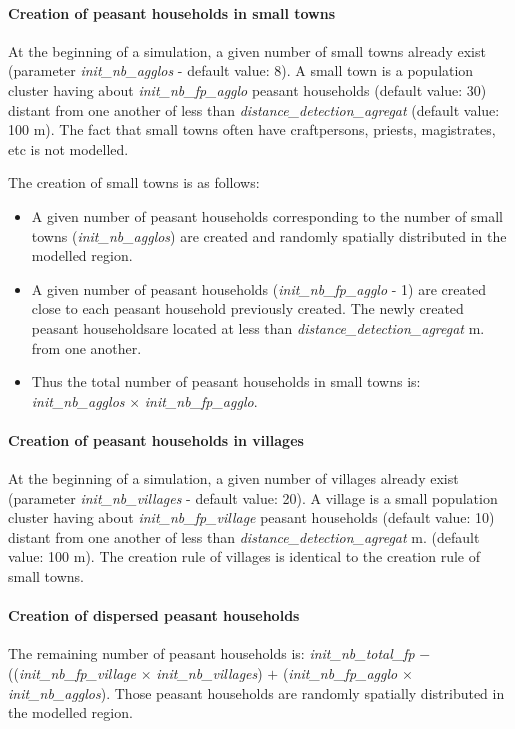 \documentclass[a4paper,11pt]{article}
\begin{document}
\begin{sloppypar}
\paragraph{Creation of peasant households in small towns} At the beginning of a simulation, a given number of small towns already exist (parameter \textit{init\_nb\_agglos} - default value: 8). A small town is a population cluster having about \textit{init\_nb\_fp\_agglo} peasant households (default value: 30) distant from one another of less than \textit{distance\_detection\_agregat} (default value: 100 m). The fact that small towns often have craftpersons, priests, magistrates, etc is not modelled.
\end{sloppypar}
\bigskip
The creation of small towns is as follows:
\begin{sloppypar}
\begin{itemize}
  \item A given number of peasant households corresponding to the number of small towns (\textit{init\_nb\_agglos}) are created and randomly spatially distributed in the modelled region.
  \item A given number of peasant households (\textit{init\_nb\_fp\_agglo} - 1) are created close to each peasant household previously created. The newly created peasant householdsare located at less than \textit{distance\_detection\_agregat} m. from one another.
  \item Thus the total number of peasant households in small towns is: \textit{init\_nb\_agglos} $\times$ \textit{init\_nb\_fp\_agglo}.
\end{itemize}
\end{sloppypar}

\paragraph{Creation of peasant households in villages} At the beginning of a simulation, a given number of villages already exist (parameter \textit{init\_nb\_villages} - default value: 20). A village is a small population cluster having about \textit{init\_nb\_fp\_village} peasant households (default value: 10) distant from one another of less than \textit{distance\_detection\_agregat} m. (default value: 100 m). The creation rule of villages is identical to the creation rule of small towns.

\paragraph{Creation of dispersed peasant households}
\begin{sloppypar}
The remaining number of peasant households is: \textit{init\_nb\_total\_fp} $-$ ((\textit{init\_nb\_fp\_village} $\times$ \textit{init\_nb\_villages}) $+$ (\textit{init\_nb\_fp\_agglo} $\times$ \textit{init\_nb\_agglos}). Those peasant households are randomly spatially distributed in the modelled region.
\end{sloppypar}
\end{document}
